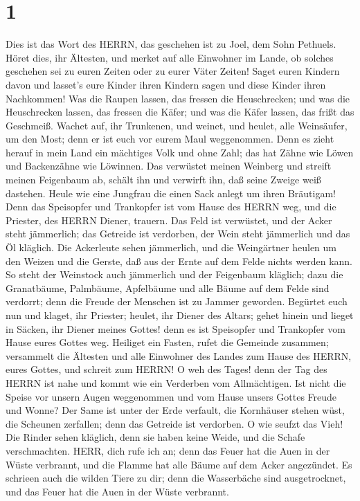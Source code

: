 \hypertarget{section}{%
\section{1}\label{section}}

 Dies ist das Wort des HERRN, das geschehen ist zu Joel, dem
Sohn Pethuels.  Höret dies, ihr Ältesten, und merket auf
alle Einwohner im Lande, ob solches geschehen sei zu euren Zeiten oder
zu eurer Väter Zeiten!  Saget euren Kindern davon und
lasset's eure Kinder ihren Kindern sagen und diese Kinder ihren
Nachkommen!  Was die Raupen lassen, das fressen die
Heuschrecken; und was die Heuschrecken lassen, das fressen die Käfer;
und was die Käfer lassen, das frißt das Geschmeiß.  Wachet
auf, ihr Trunkenen, und weinet, und heulet, alle Weinsäufer, um den
Most; denn er ist euch vor eurem Maul weggenommen.  Denn es
zieht herauf in mein Land ein mächtiges Volk und ohne Zahl; das hat
Zähne wie Löwen und Backenzähne wie Löwinnen.  Das verwüstet
meinen Weinberg und streift meinen Feigenbaum ab, schält ihn und
verwirft ihn, daß seine Zweige weiß dastehen.  Heule wie
eine Jungfrau die einen Sack anlegt um ihren Bräutigam! 
Denn das Speisopfer und Trankopfer ist vom Hause des HERRN weg, und die
Priester, des HERRN Diener, trauern.  Das Feld ist
verwüstet, und der Acker steht jämmerlich; das Getreide ist verdorben,
der Wein steht jämmerlich und das Öl kläglich.  Die
Ackerleute sehen jämmerlich, und die Weingärtner heulen um den Weizen
und die Gerste, daß aus der Ernte auf dem Felde nichts werden kann.
 So steht der Weinstock auch jämmerlich und der Feigenbaum
kläglich; dazu die Granatbäume, Palmbäume, Apfelbäume und alle Bäume auf
dem Felde sind verdorrt; denn die Freude der Menschen ist zu Jammer
geworden.  Begürtet euch nun und klaget, ihr Priester;
heulet, ihr Diener des Altars; gehet hinein und lieget in Säcken, ihr
Diener meines Gottes! denn es ist Speisopfer und Trankopfer vom Hause
eures Gottes weg.  Heiliget ein Fasten, rufet die Gemeinde
zusammen; versammelt die Ältesten und alle Einwohner des Landes zum
Hause des HERRN, eures Gottes, und schreit zum HERRN!  O
weh des Tages! denn der Tag des HERRN ist nahe und kommt wie ein
Verderben vom Allmächtigen.  Ist nicht die Speise vor
unsern Augen weggenommen und vom Hause unsers Gottes Freude und Wonne?
 Der Same ist unter der Erde verfault, die Kornhäuser
stehen wüst, die Scheunen zerfallen; denn das Getreide ist verdorben.
 O wie seufzt das Vieh! Die Rinder sehen kläglich, denn sie
haben keine Weide, und die Schafe verschmachten.  HERR,
dich rufe ich an; denn das Feuer hat die Auen in der Wüste verbrannt,
und die Flamme hat alle Bäume auf dem Acker angezündet.  Es
schrieen auch die wilden Tiere zu dir; denn die Wasserbäche sind
ausgetrocknet, und das Feuer hat die Auen in der Wüste verbrannt.

